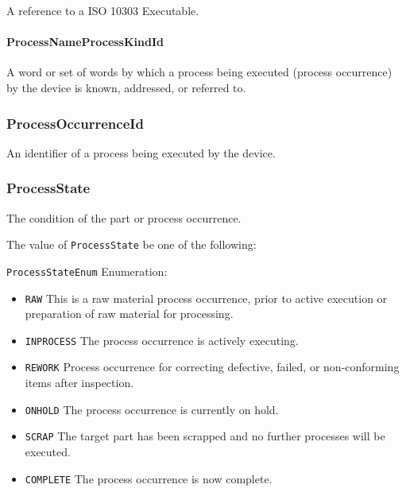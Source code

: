 A reference to a ISO 10303 Executable.


\paragraph{ProcessNameProcessKindId}\mbox{}
\label{sec:ProcessNameProcessKindId}


A word or set of words by which a process being executed (process occurrence) by the device is known, addressed, or referred to.



\subsubsection{ProcessOccurrenceId}
\label{sec:ProcessOccurrenceId}



An identifier of a process being executed by the device.


\subsubsection{ProcessState}
\label{sec:ProcessState}



The condition of the part or process occurrence.


The value of \texttt{ProcessState} \MUST be one of the following: 


\texttt{ProcessStateEnum} Enumeration:

\begin{itemize}
\item \texttt{RAW} \newline This is a raw material process occurrence, prior to active execution or preparation of raw material for processing. 
\item \texttt{IN\textunderscore PROCESS} \newline The process occurrence is actively executing.
 
\item \texttt{REWORK} \newline Process occurrence for correcting defective, failed, or non-conforming items after inspection. 
\item \texttt{ON\textunderscore HOLD} \newline The process occurrence is currently on hold. 
\item \texttt{SCRAP} \newline The target part has been scrapped and no further processes will be executed. 
\item \texttt{COMPLETE} \newline The process occurrence is now complete.
 
\end{itemize}

